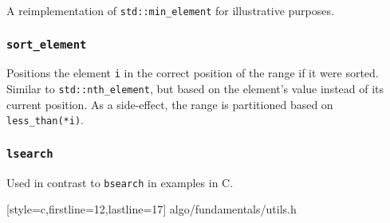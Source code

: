 A reimplementation of \texttt{std::min\_element} for illustrative purposes.


\vspace{-\baselineskip}

\subsubsection{\texttt{sort\_element}}

Positions the element \texttt{i} in the correct position of the range if it were
sorted.  Similar to \texttt{std::nth\_element}, but based on the element's value
instead of its current position.  As a side-effect, the range is partitioned
based on \texttt{less\_than(*i)}.


\vspace{-\baselineskip}

\subsubsection{\texttt{lsearch}}

Used in contrast to \texttt{bsearch} in examples in C.


    [style=c,firstline=12,lastline=17]
    {algo/fundamentals/utils.h}
\vspace{-\baselineskip}
